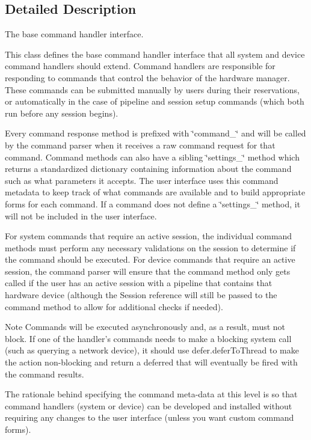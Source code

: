 \subsection{Detailed Description}
The base command handler interface. 

This class defines the base command handler interface that all system and device command handlers should extend. Command handlers are responsible for responding to commands that control the behavior of the hardware manager. These commands can be submitted manually by users during their reservations, or automatically in the case of pipeline and session setup commands (which both run before any session begins).

Every command response method is prefixed with \char`\"{}command\-\_\-\char`\"{} and will be called by the command parser when it receives a raw command request for that command. Command methods can also have a sibling \char`\"{}settings\-\_\-\char`\"{} method which returns a standardized dictionary containing information about the command such as what parameters it accepts. The user interface uses this command metadata to keep track of what commands are available and to build appropriate forms for each command. If a command does not define a \char`\"{}settings\-\_\-\char`\"{} method, it will not be included in the user interface.

For system commands that require an active session, the individual command methods must perform any necessary validations on the session to determine if the command should be executed. For device commands that require an active session, the command parser will ensure that the command method only gets called if the user has an active session with a pipeline that contains that hardware device (although the Session reference will still be passed to the command method to allow for additional checks if needed).

\begin{DoxyNote}{Note}
Commands will be executed asynchronously and, as a result, must not block. If one of the handler's commands needs to make a blocking system call (such as querying a network device), it should use defer.\-defer\-To\-Thread to make the action non-\/blocking and return a deferred that will eventually be fired with the command results.

The rationale behind specifying the command meta-\/data at this level is so that command handlers (system or device) can be developed and installed without requiring any changes to the user interface (unless you want custom command forms). 
\end{DoxyNote}


